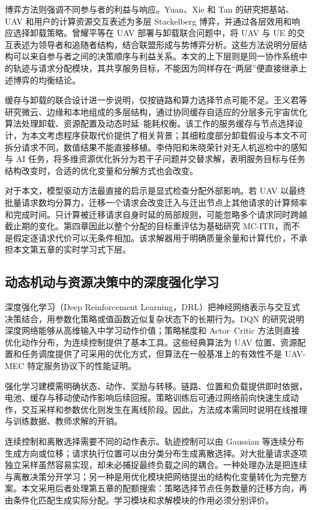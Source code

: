 博弈方法则强调不同参与者的利益与响应。Yuan、Xie 和 Tan 的研究把基站、UAV 和用户的计算资源交互表述为多层 Stackelberg 博弈，并通过各层效用和响应选择卸载策略\cite{he2019uav}。曾耀平等在 UAV 部署与卸载联合问题中，将 UAV 与 UE 的交互表述为领导者和追随者结构，结合联盟形成与势博弈分析\cite{zeng2026uav}。这些方法说明分层结构可以来自参与者之间的决策顺序与利益关系。本文的上下层则是同一协作系统中的轨迹与请求分配模块，其共享服务目标，不能因为同样存在“两层”便直接继承上述博弈的均衡结论。

缓存与卸载的联合设计进一步说明，仅按链路和算力选择节点可能不足。王义君等研究微云、边缘和本地组成的多层结构，通过协同缓存自适应的分层多元宇宙优化算法处理卸载、资源配置及动态时延--能耗权衡\cite{wang2026ccah}。该工作的服务缓存与节点选择设计，为本文考虑程序获取代价提供了相关背景；其细粒度部分卸载假设与本文不可拆分请求不同，数值结果不能直接移植。李侍阳和朱晓荣针对无人机巡检中的感知与 AI 任务，将多维资源优化拆分为若干子问题并交替求解\cite{li2026sensing}，表明服务目标与任务结构改变时，合适的优化变量和分解方式也会改变。

对于本文，模型驱动方法最直接的启示是显式检查分配外部影响。若 UAV 以最终批量请求数均分算力，迁移一个请求会改变迁入与迁出节点上其他请求的计算频率和完成时间。只计算被迁移请求自身时延的局部规则，可能忽略多个请求同时跨越截止期的变化。第四章因此以整个分配的目标重评估为基础研究 MC-ITR，而不是假定逐请求代价可以无条件相加。该求解器用于明确质量余量和计算代价，不承担本文第五章的实时学习式下层。

\subsection{动态机动与资源决策中的深度强化学习}
\label{sec:ch1-drl-related}

深度强化学习（Deep Reinforcement Learning，DRL）把神经网络表示与交互式决策结合，用参数化策略或值函数近似复杂状态下的长期行为。DQN 的研究说明深度网络能够从高维输入中学习动作价值\cite{mnih2015human}；策略梯度和 Actor--Critic 方法则直接优化动作分布，为连续控制提供了基本工具\cite{williams1992simple,lillicrap2016continuous}。这些经典算法为 UAV 位置、资源配置和任务调度提供了可采用的优化方式，但算法在一般基准上的有效性不是 UAV-MEC 特定服务协议下的性能证明。

强化学习建模需明确状态、动作、奖励与转移。链路、位置和负载提供即时依据，电池、缓存与移动使动作影响后续回报。策略训练后可通过网络前向快速生成动作，交互采样和参数优化则发生在离线阶段。因此，方法成本需同时说明在线推理与训练数据、教师求解的开销。

连续控制和离散选择需要不同的动作表示。轨迹控制可以由 Gaussian 等连续分布生成方向或位移；请求执行位置可以由分类分布生成离散选择。对大批量请求逐项独立采样虽然容易实现，却未必捕捉最终负载之间的耦合。一种处理办法是把连续与离散决策分开学习；另一种是用优化模块把网络提出的结构化变量转化为完整方案。本文采用后者处理第五章的配额搜索：策略选择节点任务数量的迁移方向，再由条件化匹配生成实际分配。学习模块和求解模块的作用必须分别评价。

